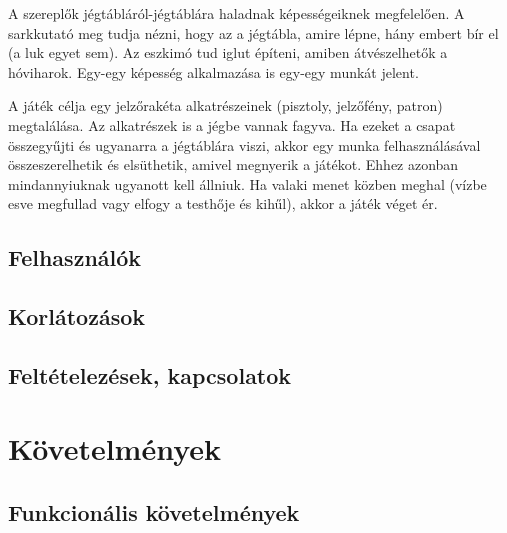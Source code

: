 A szereplők jégtábláról-jégtáblára haladnak képességeiknek megfelelően. A sarkkutató meg tudja nézni, hogy az a jégtábla, amire lépne, hány embert bír el (a luk egyet sem). Az eszkimó tud iglut építeni, amiben átvészelhetők a hóviharok. Egy-egy képesség alkalmazása is egy-egy munkát jelent.

A játék célja egy jelzőrakéta alkatrészeinek (pisztoly, jelzőfény, patron) megtalálása. Az alkatrészek is a jégbe vannak fagyva. Ha ezeket a csapat összegyűjti és ugyanarra a jégtáblára viszi, akkor egy munka felhasználásával összeszerelhetik és elsüthetik, amivel megnyerik a játékot. Ehhez azonban mindannyiuknak ugyanott kell állniuk. Ha valaki menet közben meghal (vízbe esve megfullad vagy elfogy a testhője és kihűl), akkor a játék véget ér. 

\subsection{Felhasználók}

\subsection{Korlátozások}

\subsection{Feltételezések, kapcsolatok}

\section{Követelmények}
\subsection{Funkcionális követelmények}



